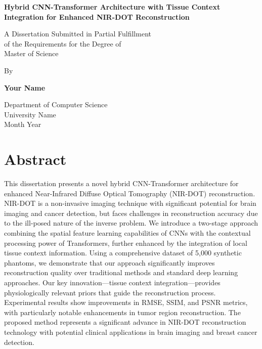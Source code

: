 \documentclass[12pt,a4paper]{report}
\begin{document}
\begin{titlepage}
    \centering
    \vspace*{1cm}
    {\Huge \textbf{Hybrid CNN-Transformer Architecture with Tissue Context Integration for Enhanced NIR-DOT Reconstruction}\par}
    \vspace{1.5cm}
    {\Large A Dissertation Submitted in Partial Fulfillment\\
    of the Requirements for the Degree of\\
    Master of Science\par}
    \vspace{2cm}
    {\large By\par}
    \vspace{0.5cm}
    {\Large\textbf{Your Name}\par}
    \vspace{2cm}
    {\large Department of Computer Science\\
    University Name\\
    Month Year\par}
\end{titlepage}

\chapter*{Abstract}
This dissertation presents a novel hybrid CNN-Transformer architecture for enhanced Near-Infrared Diffuse Optical Tomography (NIR-DOT) reconstruction. NIR-DOT is a non-invasive imaging technique with significant potential for brain imaging and cancer detection, but faces challenges in reconstruction accuracy due to the ill-posed nature of the inverse problem. We introduce a two-stage approach combining the spatial feature learning capabilities of CNNs with the contextual processing power of Transformers, further enhanced by the integration of local tissue context information. Using a comprehensive dataset of 5,000 synthetic phantoms, we demonstrate that our approach significantly improves reconstruction quality over traditional methods and standard deep learning approaches. Our key innovation—tissue context integration—provides physiologically relevant priors that guide the reconstruction process. Experimental results show improvements in RMSE, SSIM, and PSNR metrics, with particularly notable enhancements in tumor region reconstruction. The proposed method represents a significant advance in NIR-DOT reconstruction technology with potential clinical applications in brain imaging and breast cancer detection.
\end{document}
